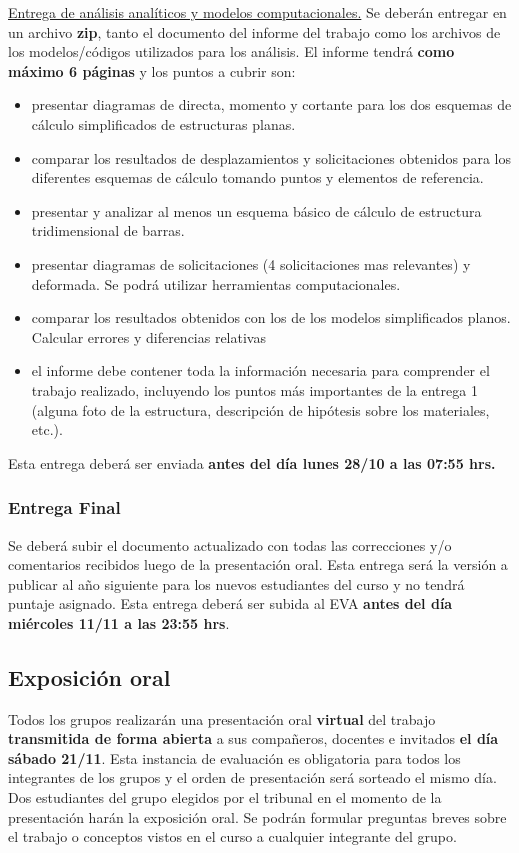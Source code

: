 \documentclass[a4paper,11pt,twocolumn]{article}
\begin{document}
\underline{Entrega de análisis analíticos y modelos computacionales.}
Se deberán entregar en un archivo \textbf{zip}, tanto el documento del informe del trabajo como los archivos de los modelos/códigos utilizados para los análisis. %
%
El informe tendrá \textbf{como máximo 6 páginas} y los puntos a cubrir son:
%
\begin{itemize}
	\item presentar diagramas de directa, momento y cortante para los dos esquemas de cálculo simplificados de estructuras planas.
	\item comparar los resultados de desplazamientos y solicitaciones obtenidos para los diferentes esquemas de cálculo tomando puntos y elementos de referencia.
    \item  presentar y analizar al menos un esquema básico de cálculo de estructura tridimensional de barras.
	\item presentar diagramas de solicitaciones (4 solicitaciones mas relevantes) y deformada. Se podrá utilizar herramientas computacionales.
	\item comparar los resultados obtenidos con los de los modelos simplificados planos. Calcular errores y diferencias relativas
    \item el informe debe contener toda la información necesaria para comprender el trabajo realizado, incluyendo los puntos más importantes de la entrega 1 (alguna foto de la estructura, descripción de hipótesis sobre los materiales, etc.).
\end{itemize}	

Esta entrega deberá ser enviada \textbf{antes del día lunes 28/10 a las 07:55 hrs.} %
%

\subsubsection{Entrega Final}

Se deberá subir el documento actualizado con todas las correcciones y/o comentarios recibidos luego de la presentación oral. Esta entrega será la versión a publicar al año siguiente para los nuevos estudiantes del curso y no tendrá puntaje asignado.  
%
Esta entrega deberá ser subida al EVA \textbf{antes del día miércoles 11/11 a las 23:55 hrs}. %

\subsection{Exposición oral}

Todos los grupos realizarán una presentación oral \textbf{virtual }del trabajo \textbf{transmitida de forma abierta }a sus compañeros, docentes e invitados \textbf{el día sábado 21/11}. %
%
Esta instancia de evaluación es obligatoria para todos los integrantes de los grupos y el orden de presentación será sorteado el mismo día.
%
Dos estudiantes del grupo elegidos por el tribunal en el momento de la presentación harán la exposición oral. Se podrán formular preguntas breves sobre el trabajo o conceptos vistos en el curso a cualquier integrante del grupo.
\end{document}
